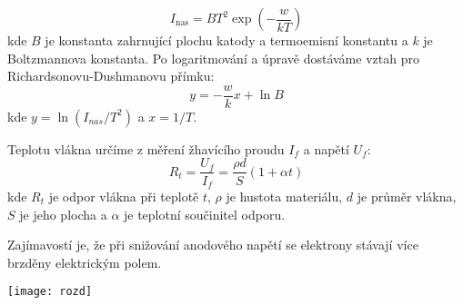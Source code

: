 \documentclass[a4paper,11pt]{article}
\begin{document}
    \hspace{10pt}
    \begin{minipage}[t]{0.5\textwidth} 
                \begin{equation}
                    I_{\text{nas}} = B T^2 \exp\left(-\frac{w}{kT}\right)
                \end{equation}
                kde $B$ je konstanta zahrnující plochu katody a termoemisní konstantu a $k$ je Boltzmannova konstanta. Po logaritmování a úpravě dostáváme vztah pro Richardsonovu-Dushmanovu přímku:
                \begin{equation}
                    y = -\frac{w}{k}x + \ln B
                \end{equation}
                kde $y = \ln (I_{nas}/T^2)$ a $x = 1/T$.
                \par Teplotu vlákna určíme z měření žhavícího proudu $I_f$ a napětí $U_f$:
                \begin{equation}
                    R_t = \frac{U_f}{I_f} = \frac{\rho d }{S} (1+ \alpha t)
                \end{equation}
                kde $R_t$ je odpor vlákna při teplotě $t$, $\rho$ je hustota materiálu, $d$ je průměr vlákna, $S$ je jeho plocha a $\alpha$ je teplotní součinitel odporu.
                \par Zajímavostí je, že při snižování anodového napětí se elektrony stávají více brzděny elektrickým polem.

                \vspace{10pt}   
                \par \centering
                \texttt{[image: rozd]}
                \captionsetup{justification=centering, font=footnotesize}
                \label{fig:dif}
                \vspace{10pt}
                \raggedright                
    \end{minipage}
\newpage
\end{document}
